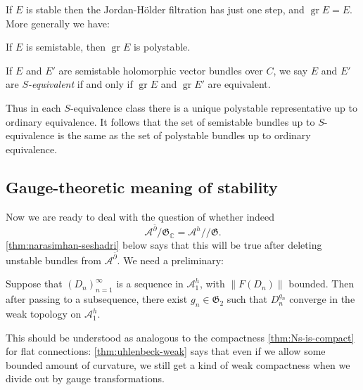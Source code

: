 \documentclass[12pt,letterpaper,reqno]{article}
\numberwithin{equation}{section}
\newcommand{\fG}{{\mathfrak G}}
\newcommand{\cA}{\ensuremath{\mathcal A}}
\newcommand{\C}{\ensuremath{\mathbb C}}
\newcommand{\kq}{/\!\!/}
\newcommand{\norm}[1]{\lVert#1\rVert}
\newcommand{\ti}[1]{\textit{#1}}
\DeclareMathOperator{\gr}{gr}
\newcommand{\fixme}[1]{{\color{orange}{[#1]}}}
\begin{document}

If $E$ is stable then the Jordan-H\"older filtration has
just one step, and $\gr E = E$. More generally we have:

\begin{prop}
If $E$ is semistable, then $\gr E$ is polystable.
\end{prop}

\begin{defn}[$S$-equivalence] If $E$ and $E'$ are semistable
holomorphic vector bundles over $C$, we say $E$ and $E'$ are
\ti{$S$-equivalent} if and only if $\gr E$ and $\gr E'$ are
equivalent.
\end{defn}

Thus in each $S$-equivalence class there is a unique polystable
representative up to ordinary equivalence.
It follows that the set of semistable bundles
up to $S$-equivalence is the same as the set of polystable bundles
up to ordinary equivalence.


\subsection{Gauge-theoretic meaning of stability}

Now we are ready to deal with the question of whether indeed
\begin{equation}
  \cA^{\bar\partial} / \fG_\C = \cA^h \kq \fG.
\end{equation}
\autoref{thm:narasimhan-seshadri} below says that this will be true
after deleting unstable bundles from $\cA^{\bar\partial}$.
We need a preliminary:

\begin{thm} \label{thm:uhlenbeck-weak}
Suppose that $(D_n)_{n=1}^\infty$ is a sequence in $\cA^h_1$, 
with $\norm{F(D_n)}$ bounded. Then after passing
to a subsequence, there exist $g_n \in \fG_2$ such that $D_n^{g_n}$
converge in the weak topology on $\cA^h_1$.
\end{thm}

This should be understood as analogous to the compactness
\autoref{thm:Ns-is-compact} for flat connections: \autoref{thm:uhlenbeck-weak}
says that
even if we allow some bounded amount of curvature, we still get a
kind of weak compactness when we divide out by gauge transformations.
\fixme{explain why strong compactness is too much to ask?}
\end{document}
